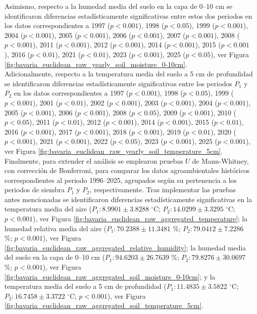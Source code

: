 Asimismo, respecto a la humedad media del suelo en la capa de 0--10 cm se identificaron diferencias estadísticamente significativas entre estos dos periodos en los datos correspondientes a 1997	($p<0.001$), 1998	($p<0.05$), 1999	($p<0.001$), 2004	($p<0.001$), 2005	($p<0.001$), 2006	($p<0.001$), 2007	($p<0.001$), 2008	($p<0.001$), 2011	($p<0.001$), 2012	($p<0.001$), 2014	($p<0.001$), 2015	($p<0.001$), 2016	($p<0.01$), 2021	($p<0.01$), 2023	($p<0.001$), 2025	($p<0.05$), ver Figura \ref{fig:bavaria_euclidean_raw_yearly_soil_moisture_0-10cm}.\\

Adicionalmente, respecto a la temperatura media del suelo a 5 cm de profundidad se identificaron diferencias estadísticamente significativas entre los periodos $P_1$ y $P_2$ en los datos correspondientes a 1997	($p<0.001$), 1998	($p<0.05$), 1999	($p<0.001$), 2001	($p<0.01$), 2002	($p<0.001$), 2003	($p<0.001$), 2004	($p<0.001$), 2005	($p<0.001$), 2006	($p<0.001$), 2008	($p<0.05$), 2009	($p<0.001$), 2010	($p<0.05$), 2011	($p<0.01$), 2012	($p<0.001$), 2014	($p<0.001$), 2015	($p<0.01$), 2016	($p<0.001$), 2017	($p<0.001$), 2018	($p<0.001$), 2019	($p<0.01$), 2020	($p<0.001$), 2021	($p<0.001$), 2022	($p<0.05$), 2023	($p<0.001$), 2025	($p<0.001$), ver Figura \ref{fig:bavaria_euclidean_raw_yearly_soil_temperature_5cm}.\\

Finalmente, para extender el análisis se emplearon pruebas $U$ de Mann-Whitney, con corrección de Bonferroni, para comparar los datos agroambientales históricos correspondientes al periodo 1996--2025, agrupados según su pertenencia a los periodos de siembra $P_1$ y $P_2$, respectivamente.  Tras implementar las pruebas antes mencionadas se identificaron diferencias estadísticamente significativas en la temperatura media del aire ($P_1:	8.9901	\pm	3.8288	$ $^\circ$C; 	$P_2:	14.0299	\pm	3.3295	$ $^\circ$C; 	$p<0.001$), ver Figura \ref{fig:bavaria_euclidean_raw_aggregated_temperature}; la humedad relativa media del aire ($P_1:	70.2388	\pm	11.3481	$ \%; 	$P_2:	79.0412	\pm	7.2286	$ \%; 	$p<0.001$), ver Figura \ref{fig:bavaria_euclidean_raw_aggregated_relative_humidity}; la humedad media del suelo en la capa de 0--10 cm  ($P_1:	94.6203	\pm	26.7639	$ \%; 	$P_2:	79.8276	\pm	30.0697	$ \%; 	$p<0.001$), ver Figura \ref{fig:bavaria_euclidean_raw_aggregated_soil_moisture_0-10cm}; y la temperatura media del suelo a 5 cm de profundidad  ($P_1:	11.4835	\pm	3.5822	$ $^\circ$C; 	$P_2:	16.7458	\pm	3.3722	$ $^\circ$C; 	$p<0.001$), ver Figura \ref{fig:bavaria_euclidean_raw_aggregated_soil_temperature_5cm}.\\

